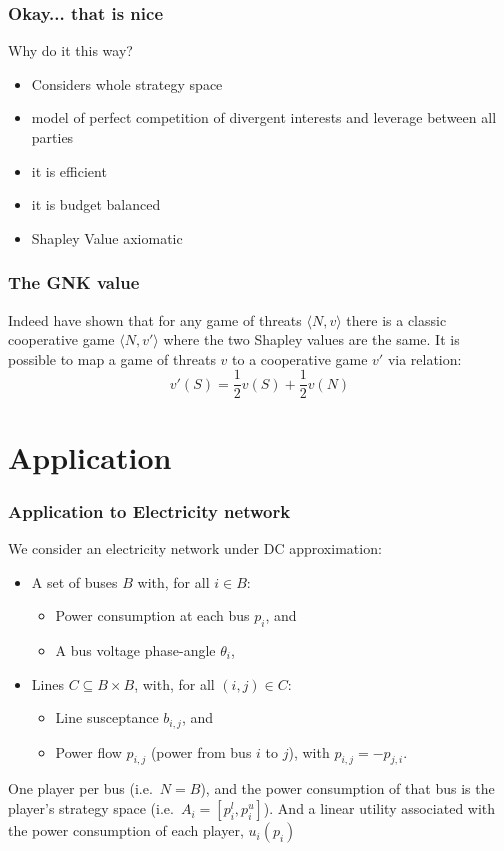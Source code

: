 \documentclass{beamer}
\begin{document}
\begin{frame}
\frametitle{Okay... that is nice}
Why do it this way?

\begin{itemize}
\item	Considers whole strategy space
\item	model of perfect competition of divergent interests and leverage between all parties
\item	it is efficient
\item	it is budget balanced
\item	Shapley Value axiomatic
\end{itemize}
\end{frame}


\begin{frame}
\frametitle{The GNK value}
Indeed \cite{KOHLBERG2018139} have shown that for any game of threats $\langle N,v\rangle$ there is a classic cooperative game $\langle N,v'\rangle$ where the two Shapley values are the same.
It is possible to map a game of threats $v$ to a cooperative game $v'$ via relation:
\begin{equation}\label{convert1}
v'(S)=\frac{1}{2}v(S)+\frac{1}{2}v(N)
\end{equation}
\end{frame}



\section{Application}

\begin{frame}
\frametitle{Application to Electricity network}
We consider an electricity network under DC approximation:
\begin{itemize}
    \item A set of buses $B$ with, for all $i\in B$:
    \begin{itemize} 
        \item Power consumption at each bus $p_i$, and 
        \item A bus voltage phase-angle $\theta_i$,
    \end{itemize}
    \item Lines $C\subseteq B\times B$, with, for all $(i,j)\in C$: 
        \begin{itemize} 
        \item Line susceptance $b_{i,j}$, and 
        \item Power flow $p_{i,j}$ (power from bus $i$ to $j$), with $p_{i,j}=-p_{j,i}$. 
    \end{itemize}
\end{itemize}

One player per bus (i.e.~$N=B$), and the power consumption of that bus is the player's strategy space (i.e.\ $A_i=[p_i^l,p_i^u]$).
And a linear utility associated with the power consumption of each player, $u_i(p_i)$
\end{frame}
\end{document}
